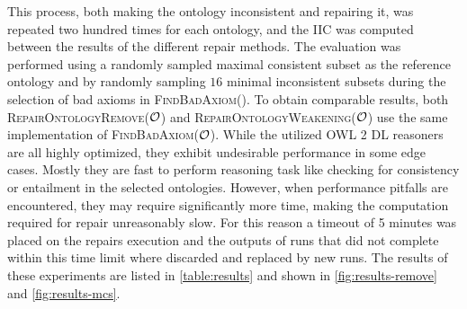 This process, both making the ontology inconsistent and repairing it, was repeated two hundred times for each ontology, and the IIC was computed between the results of the different repair methods. The evaluation was performed using a randomly sampled maximal consistent subset as the reference ontology and by randomly sampling $16$ minimal inconsistent subsets during the selection of bad axioms in \textsc{FindBadAxiom}(\Omc). To obtain comparable results, both \textsc{RepairOntologyRemove}($\mathcal{O}$) and \textsc{RepairOntologyWeakening}($\mathcal{O}$) use the same implementation of \textsc{FindBadAxiom}($\mathcal{O}$). While the utilized OWL 2 DL reasoners are all highly optimized, they exhibit undesirable performance in some edge cases. Mostly they are fast to perform reasoning task like checking for consistency or entailment in the selected ontologies. However, when performance pitfalls are encountered, they may require significantly more time, making the computation required for repair unreasonably slow. For this reason a timeout of 5 minutes was placed on the repairs execution and the outputs of runs that did not complete within this time limit where discarded and replaced by new runs. The results of these experiments are listed in \cref{table:results} and shown in \cref{fig:results-remove} and \cref{fig:results-mcs}.

